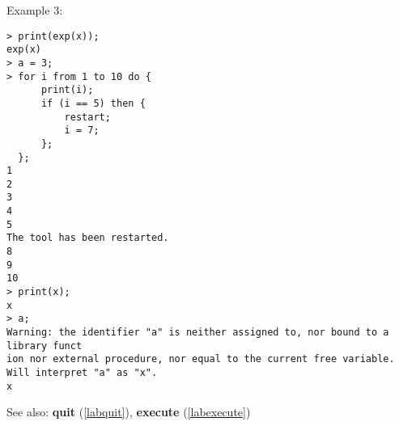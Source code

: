\noindent Example 3: 
\begin{center}\begin{minipage}{15cm}\begin{Verbatim}[frame=single]
> print(exp(x));
exp(x)
> a = 3;
> for i from 1 to 10 do {
      print(i);
      if (i == 5) then {
          restart;
          i = 7;
      };
  };
1
2
3
4
5
The tool has been restarted.
8
9
10
> print(x);
x
> a;
Warning: the identifier "a" is neither assigned to, nor bound to a library funct
ion nor external procedure, nor equal to the current free variable.
Will interpret "a" as "x".
x
\end{Verbatim}
\end{minipage}\end{center}
See also: \textbf{quit} (\ref{labquit}), \textbf{execute} (\ref{labexecute})
